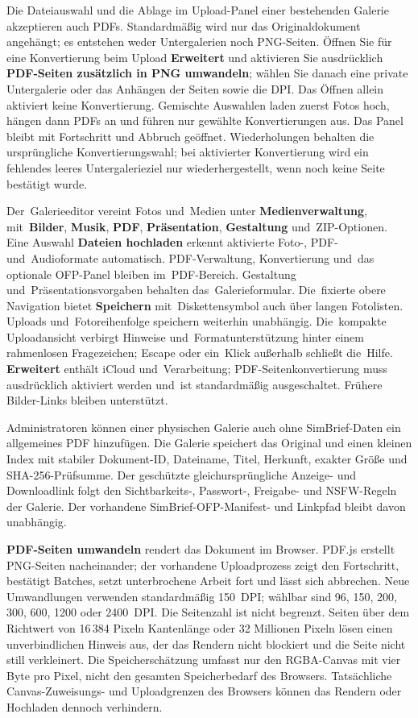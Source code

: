 \documentclass[11pt,a4paper]{article}
\newcommand{\ui}[1]{\textbf{#1}}
\begin{document}
Die Dateiauswahl und die Ablage im Upload-Panel einer bestehenden Galerie
akzeptieren auch PDFs. Standardmäßig wird nur das Originaldokument angehängt; es
entstehen weder Untergalerien noch PNG-Seiten. Öffnen Sie für eine Konvertierung
beim Upload \ui{Erweitert} und aktivieren Sie ausdrücklich \ui{PDF-Seiten
zusätzlich in PNG umwandeln}; wählen Sie danach eine private Untergalerie oder
das Anhängen der Seiten sowie die DPI. Das Öffnen allein aktiviert keine
Konvertierung. Gemischte Auswahlen laden zuerst Fotos hoch, hängen dann PDFs an
und führen nur gewählte Konvertierungen aus. Das Panel bleibt mit Fortschritt
und Abbruch geöffnet. Wiederholungen behalten die ursprüngliche
Konvertierungswahl; bei aktivierter Konvertierung wird ein fehlendes leeres
Untergalerieziel nur wiederhergestellt, wenn noch keine Seite bestätigt wurde.


Der~Galerieeditor vereint Fotos und~Medien unter \ui{Medienverwaltung},
mit~\ui{Bilder}, \ui{Musik}, \ui{PDF}, \ui{Präsentation},
\ui{Gestaltung} und~ZIP-Optionen. Eine Auswahl \ui{Dateien hochladen}
erkennt aktivierte Foto-, PDF- und~Audioformate automatisch. PDF-Verwaltung,
Konvertierung und~das optionale OFP-Panel bleiben im~PDF-Bereich.
Gestaltung und~Präsentationsvorgaben behalten das~Galerieformular.
Die~fixierte obere Navigation bietet \ui{Speichern} mit~Diskettensymbol
auch über langen Fotolisten. Uploads und~Fotoreihenfolge speichern weiterhin
unabhängig. Die~kompakte Uploadansicht verbirgt Hinweise und~Formatunterstützung
hinter einem rahmenlosen Fragezeichen; Escape oder ein~Klick außerhalb schließt
die~Hilfe. \ui{Erweitert} enthält iCloud und~Verarbeitung;
PDF-Seitenkonvertierung
muss ausdrücklich aktiviert werden und~ist standardmäßig ausgeschaltet.
Frühere Bilder-Links bleiben unterstützt.

Administratoren können einer physischen Galerie auch ohne SimBrief-Daten ein
allgemeines PDF hinzufügen. Die Galerie speichert das Original und einen kleinen
Index mit stabiler Dokument-ID, Dateiname, Titel, Herkunft, exakter Größe und
SHA-256-Prüfsumme. Der geschützte gleichursprüngliche Anzeige- und Downloadlink
folgt den Sichtbarkeits-, Passwort-, Freigabe- und NSFW-Regeln der Galerie. Der
vorhandene SimBrief-OFP-Manifest- und Linkpfad bleibt davon unabhängig.

\ui{PDF-Seiten umwandeln} rendert das Dokument im Browser. PDF.js erstellt
PNG-Seiten nacheinander; der vorhandene Uploadprozess zeigt den Fortschritt,
bestätigt Batches, setzt unterbrochene Arbeit fort und lässt sich abbrechen.
Neue Umwandlungen verwenden standardmäßig 150~DPI; wählbar sind 96, 150, 200,
300, 600, 1200 oder 2400~DPI. Die Seitenzahl ist nicht begrenzt. Seiten über dem
Richtwert von 16\,384 Pixeln Kantenlänge oder 32 Millionen Pixeln lösen einen
unverbindlichen Hinweis aus, der das Rendern nicht blockiert und die Seite nicht
still verkleinert. Die Speicherschätzung umfasst nur den RGBA-Canvas mit vier
Byte pro Pixel, nicht den gesamten Speicherbedarf des Browsers. Tatsächliche
Canvas-Zuweisungs- und Uploadgrenzen des Browsers können das Rendern oder
Hochladen dennoch verhindern.
\end{document}
